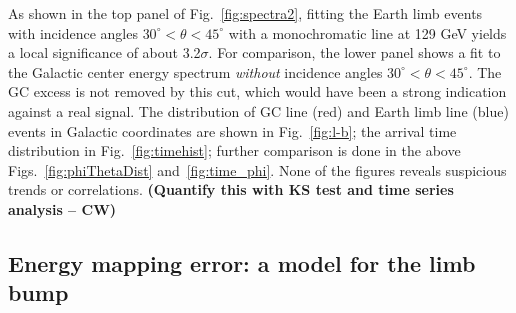 \documentclass[aps,twocolumn,prd,superscriptaddress,showpacs,nofootinbib,fixfloat]{revtex4}
\newcommand{\degree}{^{\rm o}}
\begin{document}
As shown in the top panel of Fig.~\ref{fig:spectra2},
fitting the Earth limb events with
incidence angles $30^\circ<\theta<45^\circ$ with a
monochromatic line at 129 GeV yields a local significance of about
3.2$\sigma$. For comparison, the lower panel
shows a fit to the Galactic center energy
spectrum \emph{without} incidence angles
$30^\circ<\theta<45^\circ$. The GC excess is not removed by this cut, which
would have been a strong indication against a real signal.  The distribution
of GC line (red) and Earth limb line (blue) events in Galactic coordinates are
shown in Fig.~\ref{fig:l-b}; the arrival time distribution in
Fig.~\ref{fig:timehist}; further comparison is done in the above
Figs.~\ref{fig:phiThetaDist} and~\ref{fig:time_phi}.  None of the figures
reveals suspicious trends or correlations.
\textbf{(Quantify this with KS test and time series analysis -- CW)}

\medskip

% 

% 

\subsection{Energy mapping error: a model for the limb bump}

 
\end{document}
